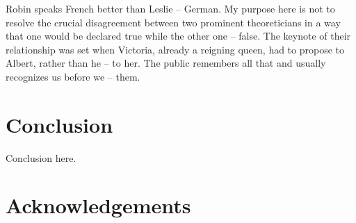 \documentclass[output=paper]{langsci/langscibook}
\begin{document}
\begin{exe}
\ex 
\begin{xlista}
\ex Robin speaks French better than Leslie -- German.
\ex My purpose here is not to resolve the crucial disagreement between two prominent theoreticians in a way that one would be declared true while the other one -- false.
\ex The keynote of their relationship was set when Victoria, already a reigning queen,
had to propose to Albert, rather than he -- to her.
\ex The public remembers all that and usually recognizes us before we -- them.\\
\citep[\S 2]{sangheepark}
\end{xlista}\label{gnc}
\end{exe}




\section{Conclusion}

Conclusion here.

 
\section*{Acknowledgements}

{\sloppy
\printbibliography[heading=subbibliography,notkeyword=this] 
}
\end{document}
